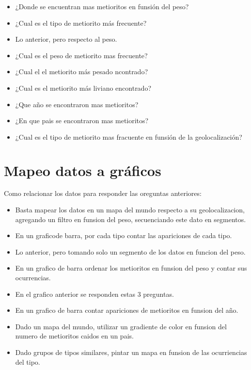 \documentclass[letterpaper,10pt]{article}
\begin{document}
	\begin{itemize}
		\item ¿Donde se encuentran mas metioritos en funsión del peso?
		\item ¿Cual es el tipo de metiorito más frecuente?
		\item Lo anterior, pero respecto al peso.
		\item ¿Cual es el peso de metiorito mas frecuente?
		\item ¿Cual el el metiorito más pesado ncontrado?
		\item ¿Cual es el metiorito más liviano encontrado?
		\item ¿Que año se encontraron mas metioritos?
		\item ¿En que pais se encontraron mas metioritos?
		\item ¿Cual es el tipo de metiorito mas fracuente en funsión de la geolocalización?
	\end{itemize}

	\newpage

	\section{Mapeo datos a gráficos}

	Como relacionar los datos para responder las oreguntas anteriores:
	
	\begin{itemize}
		\item Basta mapear los datos en un mapa del mundo respecto a su geolocalizacion, agregando un filtro en funsion del peso, secuenciando este dato en segmentos.
		\item En un graficode barra, por cada tipo contar las apariciones de cada tipo.
		\item Lo anterior, pero tomando solo un segmento de los datos en funcion del peso.
		\item En un grafico de barra ordenar los metioritos en funsion del peso y contar sus ocurrencias.
		\item En el grafico anterior se responden estas 3 preguntas.
		\item En un grafico de barra contar apariciones de metioritos en funsion del año.
		\item Dado un mapa del mundo, utilizar un gradiente de color en funsion del numero de metioritos caidos en un pais.
		\item Dado grupos de tipos similares, pintar un mapa en funsion de las ocurriencias del tipo.
	\end{itemize}
\end{document}
